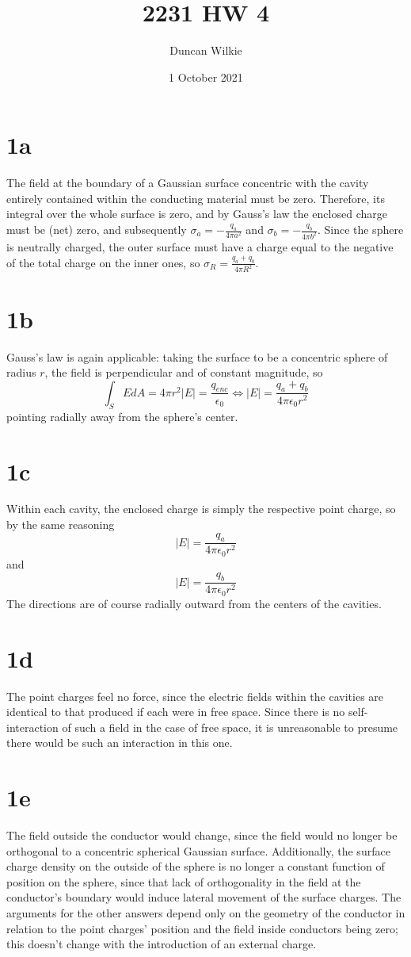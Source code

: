 \documentclass{article}
\title{2231 HW 4}
\author{Duncan Wilkie}
\date{1 October 2021}
\begin{document}
\maketitle

\section*{1a}
The field at the boundary of a Gaussian surface concentric with the cavity entirely contained within the conducting material must be zero.
Therefore, its integral over the whole surface is zero, and by Gauss's law the enclosed charge must be (net) zero, and subsequently $\sigma_a = -\frac{q_a}{4\pi a^2}$ and $\sigma_b=-\frac{q_b}{4\pi b^2}$.
Since the sphere is neutrally charged, the outer surface must have a charge equal to the negative of the total charge on the inner ones, so $\sigma_R=\frac{q_a+q_b}{4\pi R^2}$.

\section*{1b}
Gauss's law is again applicable: taking the surface to be a concentric sphere of radius $r$, the field is perpendicular and of constant magnitude, so
\[\int_SEdA=4\pi r^2|E|=\frac{q_{enc}}{\epsilon_0}\Leftrightarrow |E|=\frac{q_a+q_b}{4\pi\epsilon_0r^2}\]
pointing radially away from the sphere's center.

\section*{1c}
Within each cavity, the enclosed charge is simply the respective point charge, so by the same reasoning
\[|E|=\frac{q_a}{4\pi\epsilon_0r^2}\]
and
\[|E|=\frac{q_b}{4\pi\epsilon_0r^2}\]
The directions are of course radially outward from the centers of the cavities.

\section*{1d}
The point charges feel no force, since the electric fields within the cavities are identical to that produced if each were in free space.
Since there is no self-interaction of such a field in the case of free space, it is unreasonable to presume there would be such an interaction in this one.

\section*{1e}
The field outside the conductor would change, since the field would no longer be orthogonal to a concentric spherical Gaussian surface.
Additionally, the surface charge density on the outside of the sphere is no longer a constant function of position on the sphere, since that lack of orthogonality in the field at the conductor's boundary would induce lateral movement of the surface charges.
The arguments for the other answers depend only on the geometry of the conductor in relation to the point charges' position and the field inside conductors being zero; this doesn't change with the introduction of an external charge.
\end{document}

